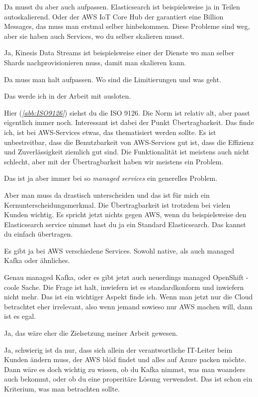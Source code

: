 \RB Da musst du aber auch aufpassen. Elasticsearch ist beispielsweise ja in Teilen autoskalierend. Oder der AWS IoT Core Hub der garantiert eine Billion Messages, das muss man erstmal selber hinbekommen. Diese Probleme sind weg, aber sie haben auch Services, wo du selber skalieren musst. 

\LF Ja, Kinesis Data Streams ist beispielsweise einer der Dienste wo man selber Shards nachprovisionieren muss, damit man skalieren kann.

\RB Da muss man halt aufpassen. Wo sind die Limitierungen und was geht.

\LF Das werde ich in der Arbeit mit ausloten.

\RB Hier (\textit{\autoref{abb:ISO9126}}) siehst du die ISO 9126. Die Norm ist relativ alt, aber passt eigentlich immer noch. Interessant ist dabei der Punkt Übertragbarkeit. Das finde ich, ist bei \ac{AWS}-Services etwas, das thematisiert werden sollte. Es ist unbestreitbar, dass die Benutzbarkeit von \ac{AWS}-Services gut ist, dass die Effizienz und Zuverlässigkeit ziemlich gut sind. Die Funktionalität ist meistens auch nicht schlecht, aber mit der Übertragbarkeit haben wir meistens ein Problem.

\LF Das ist ja aber immer bei so \textit{managed services} ein generelles Problem.

\RB Aber man muss da drastisch unterscheiden und das ist für mich ein Kernunterscheidungsmerkmal. Die Übertragbarkeit ist trotzdem bei vielen Kunden wichtig. Es spricht jetzt nichts gegen \ac{AWS}, wenn du beispielsweise den Elasticsearch service nimmst hast du ja ein Standard Elasticsearch. Das kannst du einfach übertragen.

\LF Es gibt ja bei \ac{AWS} verschiedene Services. Sowohl native, als auch managed Kafka oder ähnliches.

\RB Genau managed Kafka, oder es gibt jetzt auch neuerdings managed OpenShift - coole Sache. Die Frage ist  halt, inwiefern ist es standardkonform und inwiefern nicht mehr. Das ist ein wichtiger Aspekt finde ich. Wenn man jetzt nur die Cloud betrachtet eher irrelevant, also wenn jemand sowieso nur \ac{AWS} machen will, dann ist es egal.

\LF Ja, das wäre eher die Zielsetzung meiner Arbeit gewesen.

\RB Ja, schwierig ist da nur, dass sich allein der verantwortliche IT-Leiter beim Kunden ändern muss, der \ac{AWS} blöd findet und alles auf Azure packen möchte. Dann wäre es doch wichtig zu wissen, ob du Kafka nimmst, was man woanders auch bekommt, oder ob du eine properitäre Lösung verwendest. Das ist schon ein Kriterium, was man betrachten sollte.

